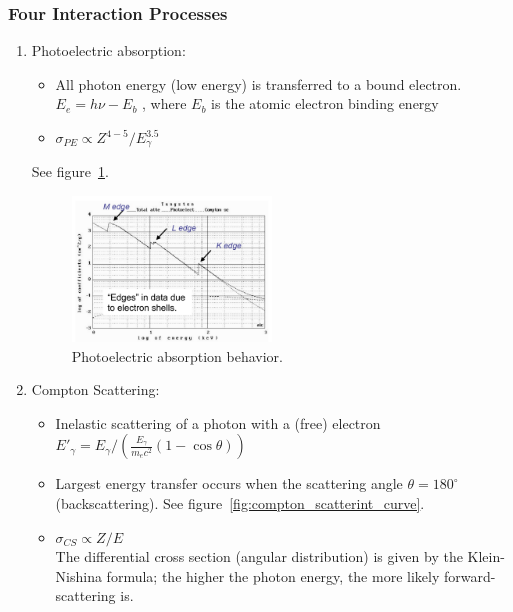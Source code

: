 \subsubsection{Four Interaction Processes}
\begin{enumerate}
    \item Photoelectric absorption:
    \begin{itemize}
        \item All photon energy (low energy) is transferred to a bound electron.\\
        $E_e=h\nu-E_b$ , where $E_b$ is the atomic electron binding energy
        \item $\sigma_{PE}\propto Z^{4-5}/E_\gamma^{3.5}$
    \end{itemize}
    See figure~\ref{fig:photoelectric_absorption_edges}.
    \begin{figure}[ht]
        \centering
        \includegraphics[width=0.5\textwidth]{images/photoelectric_absorption_edges.png}
        \caption{Photoelectric absorption behavior.}
        \label{fig:photoelectric_absorption_edges}
    \end{figure}
    \item Compton Scattering:
    \begin{itemize}
        \item Inelastic scattering of a photon with a (free) electron\\
        $E'_\gamma=E_\gamma/\left(\frac{E_\gamma}{m_ec^2}(1-\cos\theta)\right)$
        \item Largest energy transfer occurs when the scattering angle $\theta=180^\circ$ (backscattering). See figure~\ref{fig:compton_scatterint_curve}.
        \item $\sigma_{CS}\propto Z/E$\\
        The differential cross section (angular distribution) is given by the Klein-Nishina formula; the higher the photon energy, the more likely forward-scattering is.
    \end{itemize}
    \begin{figure}[ht]

\end{figure}
\end{enumerate}
